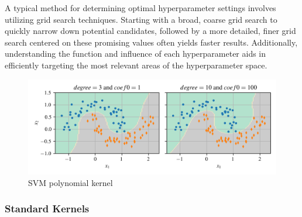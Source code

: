 \documentclass[12pt,letter]{article}
\begin{document}
\begin{mdframed}[middlelinewidth=0.5mm]
\begin{center}
\end{center}
A typical method for determining optimal hyperparameter settings involves utilizing grid search techniques. Starting with a broad, coarse grid search to quickly narrow down potential candidates, followed by a more detailed, finer grid search centered on these promising values often yields faster results. Additionally, understanding the function and influence of each hyperparameter aids in efficiently targeting the most relevant areas of the hyperparameter space.
\end{mdframed}


\begin{figure}[H]
	\centering
	\includegraphics[width=6.5in]{../figures/SVM_polynomial_kernel.png}
	\caption{SVM polynomial kernel}
	\label{fig:SVM_polynomial_kernel}
\end{figure}


\subsubsection{Standard Kernels}
\end{document}
